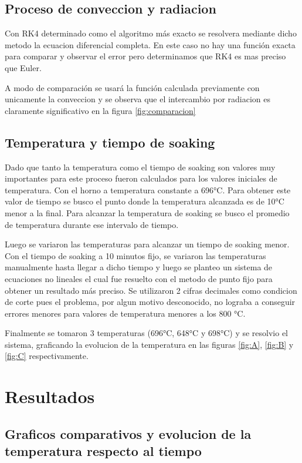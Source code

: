 \documentclass[11pt,a4paper]{article}
\begin{document}
\subsection{Proceso de conveccion y radiacion}

Con RK4 determinado como el algoritmo más exacto se resolvera mediante dicho metodo la ecuacion diferencial completa. En este caso no hay una función exacta para comparar y observar el error pero determinamos que RK4 es mas preciso que Euler.

A modo de comparación se usará la función calculada previamente con unicamente la conveccion y se observa que el intercambio por radiacion es claramente significativo en la figura \ref{fig:comparacion}

\subsection{Temperatura y tiempo de soaking}

Dado que tanto la temperatura como el tiempo de soaking son valores muy importantes para este proceso fueron calculados para los valores iniciales de temperatura. Con el horno a temperatura constante a 696°C. Para obtener este valor de tiempo se busco el punto donde la temperatura alcanzada es de 10°C menor a la final. Para alcanzar la temperatura de soaking se busco el promedio de temperatura durante ese intervalo de tiempo.

Luego se variaron las temperaturas para alcanzar un tiempo de soaking menor. Con el tiempo de soaking a 10 minutos fijo, se variaron las temperaturas manualmente hasta llegar a dicho tiempo y luego se planteo un sistema de ecuaciones no lineales el cual fue resuelto con el metodo de punto fijo para obtener un resultado más preciso. Se utilizaron 2 cifras decimales como condicion de corte pues el problema, por algun motivo desconocido, no lograba a conseguir errores menores para valores de temperatura menores a los 800 °C.

Finalmente se tomaron 3 temperaturas (696°C, 648°C y 698°C) y se resolvio el sistema, graficando la evolucion de la temperatura en las figuras \ref{fig:A}, \ref{fig:B} y \ref{fig:C} respectivamente.

\section{Resultados}

\subsection{Graficos comparativos y evolucion de la temperatura respecto al tiempo}
\end{document}
